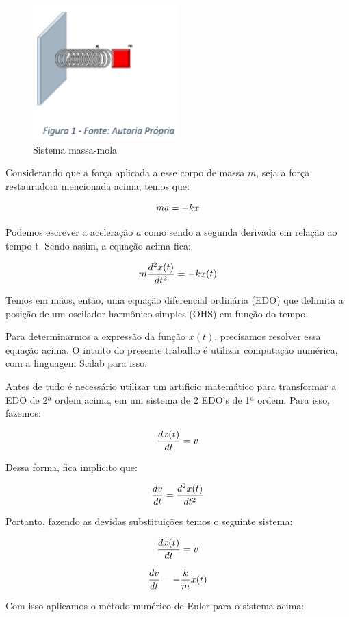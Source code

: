 \begin{figure}[H]
	\centering
	\includegraphics[width=0.5\textwidth]{./Imagens/OHS/ohs1.png} 
	\caption{Sistema massa-mola}
	\label{fig:OHS1}
\end{figure}

Considerando que a força aplicada a esse corpo de massa $m$, seja a força restauradora mencionada acima, temos que:

\[\Large ma = -kx\]

Podemos escrever a aceleração $a$ como sendo a segunda derivada em relação ao tempo t. Sendo assim, a equação acima fica: 

\[\Large m \frac{d^2x(t)}{dt^2} = -kx(t)\]

Temos em mãos, então, uma equação diferencial ordinária (EDO) que delimita a posição de um oscilador harmônico simples (OHS) em função do tempo.

Para determinarmos a expressão da função $x(t)$, precisamos resolver essa equação acima.  O intuito do presente trabalho é utilizar computação numérica, com a linguagem Scilab para isso. 

Antes de tudo é necessário utilizar um artificio matemático para transformar a EDO de 2ª ordem acima, em um sistema de 2 EDO’s de 1ª ordem. Para isso, fazemos: 

\[\Large \frac{dx(t)}{dt} = v\]

Dessa forma, fica implícito que:

\[\Large \frac{dv}{dt} = \frac{d^2x(t)}{dt^2}\]

Portanto, fazendo as devidas substituições temos o seguinte sistema:

\[\Large \frac{dx(t)}{dt} = v\]

\[\Large \frac{dv}{dt} = -\frac{k}{m}x(t)\]

Com isso aplicamos o método numérico de Euler para o sistema acima:


